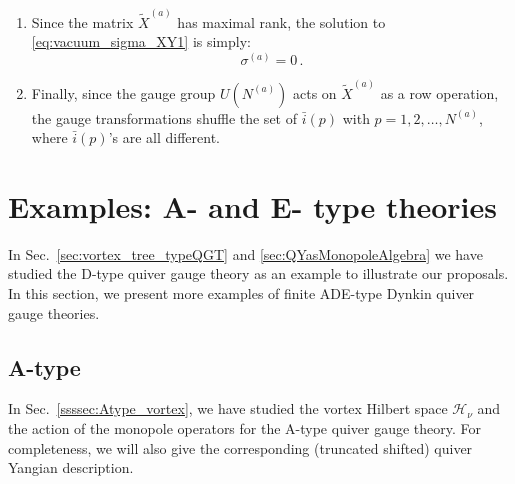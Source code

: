 \documentclass[12pt,a4paper]{article}
\renewcommand{\(}{\left(}
\renewcommand{\)}{\right)}
\renewcommand{\(}{\left(}
\renewcommand{\)}{\right)}
\begin{document}
\begin{enumerate}
\item Since the matrix $\tilde{X}^{(a)}$ has maximal rank, the solution to \eqref{eq:vacuum_sigma_XY1} is simply:
\begin{equation}
\sigma^{(a)}=0\,.
\end{equation}

\item Finally, since the gauge group $U(N^{(a)})$ acts on $\tilde{X}^{(a)}$ as a row operation, the gauge transformations shuffle the set of $\bar{i}(p)$ with $p=1,2,\dots, N^{(a)}$, where $\bar{i}(p)$'s are all different. 

\end{enumerate}

\section{Examples: A- and E- type theories}
\label{appsec:ADE_examples}
In Sec.~\ref{sec:vortex_tree_typeQGT} and \ref{sec:QYasMonopoleAlgebra} we have studied the D-type quiver gauge theory as an example to illustrate our proposals. 
In this section, we present more examples of finite ADE-type Dynkin quiver gauge theories.


\subsection{A-type}\label{appssec:Atype_QY}

In Sec.~\ref{ssssec:Atype_vortex}, we have studied the vortex Hilbert space $\mathcal{H}_\nu$ and the action of the monopole operators for the A-type quiver gauge theory.
For completeness, we will also give the corresponding (truncated shifted) quiver Yangian description.
\end{document}
